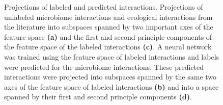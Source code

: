 \begin{figure}
{    }
    \caption{Projections of labeled and predicted interactions. Projections of unlabeled microbiome interactions and ecological interactions from the literature into subspaces spanned by two important axes of the feature space \textbf{(a)} and the first and second principle components of the feature space of the labeled interactions \textbf{(c)}. A neural network was trained using the feature space of labeled interactions and labels were predicted for the microbiome interactions. These predicted interactions were projected into subspaces spanned by the same two axes of the feature space of labeled interactions \textbf{(b)} and into a space spanned by their first and second principle components \textbf{(d)}.}
    \label{fig:FP_classified}
\end{figure}